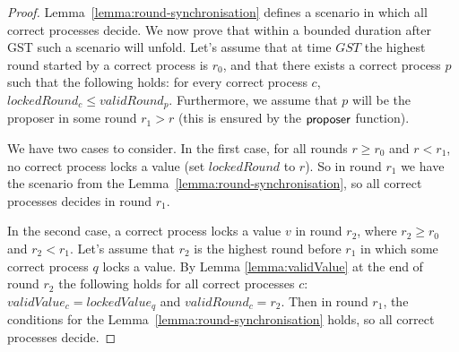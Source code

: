 \begin{proof} Lemma~\ref{lemma:round-synchronisation} defines a scenario in
    which all correct processes decide. We now prove that within a bounded
    duration after GST such a scenario will unfold. Let's assume that at time
    $GST$ the highest round started by a correct process is $r_0$, and that
    there exists a correct process $p$ such that the following holds: for every
    correct process $c$, $lockedRound_c \le validRound_p$. Furthermore, we
    assume that $p$ will be the proposer in some round $r_1 > r$ (this is
    ensured by the $\mathsf{proposer}$ function). 

We have two cases to consider. In the first case, for all rounds $r \ge r_0$
and $r < r_1$, no correct process locks a value (set $lockedRound$ to $r$). So
in round $r_1$ we have the scenario from the
Lemma~\ref{lemma:round-synchronisation}, so all correct processes decides in
round $r_1$.  

In the second case, a correct process locks a value $v$ in round $r_2$, where
$r_2 \ge r_0$ and $r_2 < r_1$.  Let's assume that $r_2$ is the highest round
before $r_1$ in which some correct process $q$ locks a value. By Lemma
\ref{lemma:validValue} at the end of round $r_2$ the following holds for all
correct processes $c$: $validValue_c = lockedValue_q$ and $validRound_c = r_2$.
Then in round $r_1$, the conditions for the
Lemma~\ref{lemma:round-synchronisation} holds, so all correct processes decide.
\end{proof}	

